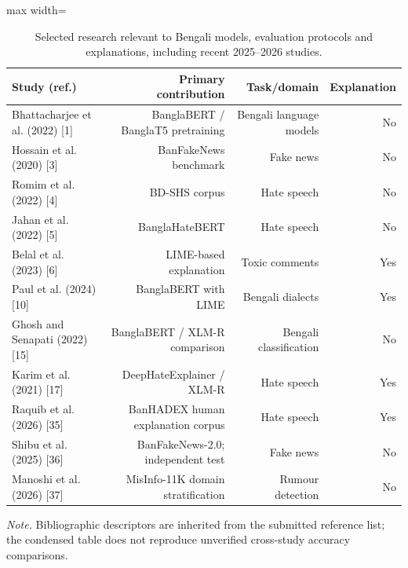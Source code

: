 \begin{table}[t]
\centering
\caption{Selected research relevant to Bengali models, evaluation protocols and explanations, including recent 2025--2026 studies.}
\label{tab:litreview}
\footnotesize
\begin{adjustbox}{max width=\linewidth}
\begin{tabular}{lrrr}
\toprule
Study (ref.) & Primary contribution & Task/domain & Explanation \\
\midrule
Bhattacharjee et al. (2022) [1] & BanglaBERT / BanglaT5 pretraining & Bengali language models & No \\
Hossain et al. (2020) [3] & BanFakeNews benchmark & Fake news & No \\
Romim et al. (2022) [4] & BD-SHS corpus & Hate speech & No \\
Jahan et al. (2022) [5] & BanglaHateBERT & Hate speech & No \\
Belal et al. (2023) [6] & LIME-based explanation & Toxic comments & Yes \\
Paul et al. (2024) [10] & BanglaBERT with LIME & Bengali dialects & Yes \\
Ghosh and Senapati (2022) [15] & BanglaBERT / XLM-R comparison & Bengali classification & No \\
Karim et al. (2021) [17] & DeepHateExplainer / XLM-R & Hate speech & Yes \\
Raquib et al. (2026) [35] & BanHADEX human explanation corpus & Hate speech & Yes \\
Shibu et al. (2025) [36] & BanFakeNews-2.0; independent test & Fake news & No \\
Manoshi et al. (2026) [37] & MisInfo-11K domain stratification & Rumour detection & No \\
\bottomrule
\end{tabular}
\end{adjustbox}
\par\vspace{2pt}
\begin{minipage}{\linewidth}
\scriptsize\emph{Note.} Bibliographic descriptors are inherited from the submitted reference list; the condensed table does not reproduce unverified cross-study accuracy comparisons.
\end{minipage}
\end{table}

